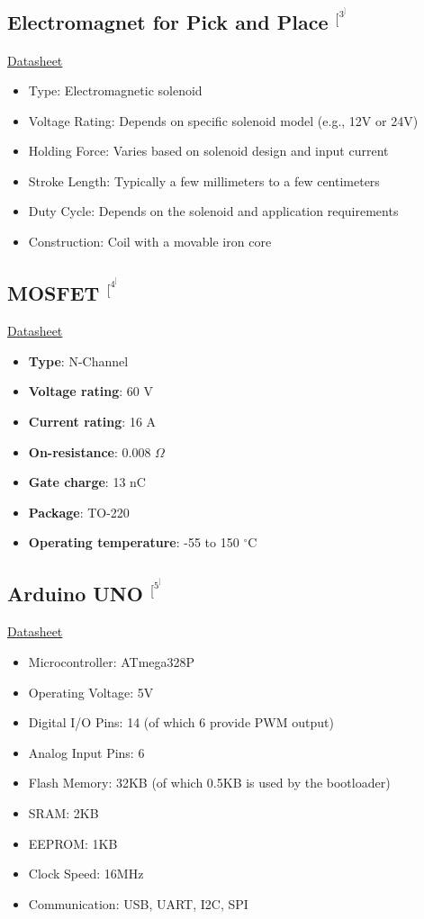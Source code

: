 \documentclass[a4paper,12pt,oneside]{book}
\begin{document}
\subsection*{Electromagnet for Pick and Place $^[^3^]$}

\href{https://robu.in/product/electric-sucker-electromagnet-kk-p20-15-12v/}{Datasheet}
\begin{itemize}
  \item Type: Electromagnetic solenoid
  \item Voltage Rating: Depends on specific solenoid model (e.g., 12V or 24V)
  \item Holding Force: Varies based on solenoid design and input current
  \item Stroke Length: Typically a few millimeters to a few centimeters
  \item Duty Cycle: Depends on the solenoid and application requirements
  \item Construction: Coil with a movable iron core
\end{itemize}


\subsection*{MOSFET $^[^4^]$}
\href{https://datasheetspdf.com/pdf/767763/Alpha&OmegaSemiconductors/AOD4184A/1}{Datasheet}
\begin{itemize}
    \item \textbf{Type}: N-Channel
    \item \textbf{Voltage rating}: 60 V
    \item \textbf{Current rating}: 16 A
    \item \textbf{On-resistance}: 0.008 $\Omega$
    \item \textbf{Gate charge}: 13 nC
    \item \textbf{Package}: TO-220
    \item \textbf{Operating temperature}: -55 to 150 $^\circ$C
\end{itemize}

\subsection*{Arduino UNO $^[^5^]$}
\href{https://docs.arduino.cc/resources/datasheets/A000066-datasheet.pdf}{Datasheet}
\begin{itemize}
  \item Microcontroller: ATmega328P
  \item Operating Voltage: 5V
  \item Digital I/O Pins: 14 (of which 6 provide PWM output)
  \item Analog Input Pins: 6
  \item Flash Memory: 32KB (of which 0.5KB is used by the bootloader)
  \item SRAM: 2KB
  \item EEPROM: 1KB
  \item Clock Speed: 16MHz
  \item Communication: USB, UART, I2C, SPI
\end{itemize}
\end{document}
